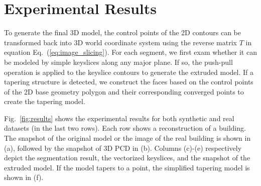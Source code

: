 \documentclass[10pt,twocolumn,letterpaper]{article}
\newcommand{\Eq}[1] {Eq.~(\ref{eq:#1})}
\newcommand{\Fig}[1]{Fig.~\ref{fig:#1}}
\begin{document}
\section{Experimental Results}
\label{sec:IR_OUT}

To generate the final 3D model, the control
points of the 2D contours can be transformed back into 3D world coordinate system
using the reverse matrix $T$ in equation \Eq{image_slicing}.
For each segment, we first exam whether it can be modeled 
by simple keyslices along any major plane.
If so, the push-pull operation is applied to the keyslice contours to
generate the extruded model.
If a tapering structure is detected, we construct the faces
based on the control points of the 2D base geometry polygon 
and their corresponding converged points to create the tapering model.

\Fig{results} shows the experimental results for both synthetic and 
real datasets (in the last two rows).
Each row shows a reconstruction of a building. 
The snapshot of the original model or the image of the real building
is shown in (a), followed by the snapshot of 3D PCD in (b).
Columns (c)-(e) respectively depict the segmentation result,
the vectorized keyslices, and the snapshot of the extruded model.
If the model tapers to a point, the simplified tapering model
is shown in (f).
\end{document}

